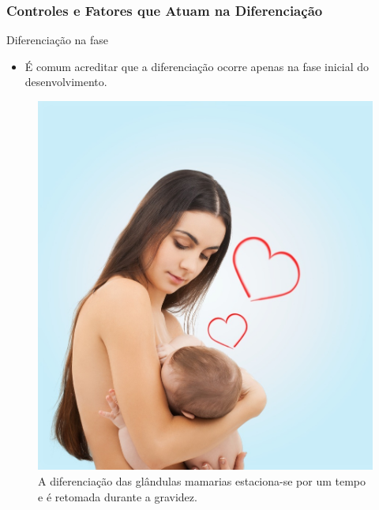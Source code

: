 \documentclass[brazil]{beamer}
\begin{document}
\begin{frame}
  \frametitle{Controles e Fatores que Atuam na Diferenciação}
  \raggedright
     \begin{block}{Diferenciação na fase }
    \footnotesize 
	\begin{itemize}
	    \item É comum acreditar que a diferenciação ocorre apenas na fase inicial do desenvolvimento.
	\end{itemize}
    \end{block}
    

    \pause
    \begin{figure}
        \includegraphics[scale=0.15]{amamentacao.jpg}
	\caption{\tiny A diferenciação das glândulas mamarias estaciona-se por um tempo e é retomada durante a gravidez.}
    \end{figure}
\end{frame}

\end{document}
